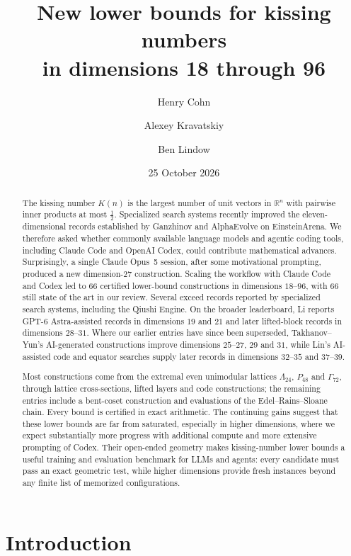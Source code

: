 \documentclass[11pt]{amsart}
\title[Kissing numbers in dimensions 18 to 96]
      {New lower bounds for kissing numbers\\in dimensions 18 through 96}
\author{Henry Cohn}
\author{Alexey Kravatskiy}
\author{Ben Lindow}
\date{25 October 2026}
\theoremstyle{remark}
\newcommand{\Leech}{\Lambda_{24}}
\newcommand{\Pff}{P_{48}}
\newcommand{\Gsz}{\Gamma_{72}}
\newcommand{\R}{\mathbb{R}}
\begin{document}
\begin{abstract}
The kissing number $K(n)$ is the largest number of unit vectors in $\R^n$ with
pairwise inner products at most $\tfrac12$. Specialized search systems recently
improved the eleven-dimensional records established by Ganzhinov and AlphaEvolve
on EinsteinArena. We therefore asked
whether commonly available language models and agentic coding tools, including
Claude Code and OpenAI Codex, could contribute mathematical advances. Surprisingly,
a single Claude Opus~5 session, after some motivational prompting, produced a new
dimension-$27$ construction. Scaling the workflow with Claude Code and Codex led to $66$ certified lower-bound
constructions in dimensions $18$--$96$, with $66$ still state of the art in our
review. Several exceed records reported by specialized search systems, including
the Qiushi Engine. On the broader leaderboard, Li reports GPT-6 Astra-assisted
records in dimensions $19$ and $21$ and later lifted-block records in dimensions
$28$--$31$. Where our earlier entries have since been superseded, Takhanov--Yun's
AI-generated constructions improve dimensions $25$--$27$, $29$ and $31$, while
Lin's AI-assisted code and equator searches supply later records in dimensions
$32$--$35$ and $37$--$39$.

Most constructions come from the extremal even unimodular lattices
$\Leech$, $\Pff$ and $\Gsz$, through lattice cross-sections, lifted layers and
code constructions; the remaining entries include a bent-coset construction and
evaluations of the Edel--Rains--Sloane chain. Every bound is certified in exact
arithmetic. The continuing gains suggest that these lower bounds are far from
saturated, especially in higher dimensions, where we expect substantially more
progress with additional compute and more extensive prompting of Codex.
Their open-ended geometry makes
kissing-number lower bounds a useful training and evaluation benchmark for LLMs
and agents: every candidate must pass an exact geometric test, while higher
dimensions provide fresh instances beyond any finite list of memorized
configurations.
\end{abstract}

\maketitle

\section{Introduction}\label{sec:intro}
\end{document}
